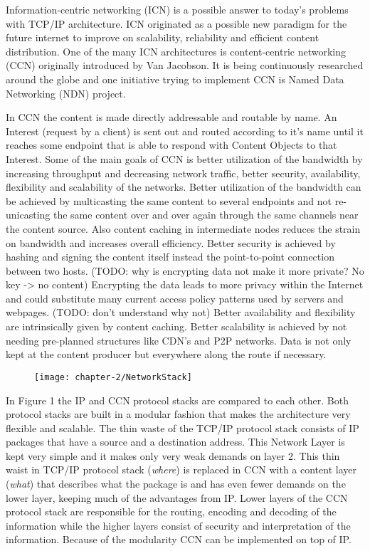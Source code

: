 Information-centric networking (ICN) is a possible answer to today's problems with TCP/IP architecture. ICN originated as a possible new paradigm for the future internet to improve on scalability, reliability and efficient content distribution. One of the many ICN architectures is content-centric networking (CCN) originally introduced by Van Jacobson. It is being continuously researched around the globe and one initiative trying to implement CCN is Named Data Networking (NDN) project.

\vspace{5mm} %

In CCN the content is made directly addressable and routable by name. An Interest (request by a client) is sent out and routed according to it's name until it reaches some endpoint that is able to respond with Content Objects to that Interest. Some of the main goals of CCN is better utilization of the bandwidth by increasing throughput and decreasing network traffic, better security, availability, flexibility and scalability of the networks. Better utilization of the bandwidth can be achieved by multicasting the same content to several endpoints and not re-unicasting the same content over and over again through the same channels near the content source. Also content caching in intermediate nodes reduces the strain on bandwidth and increases overall efficiency. Better security is achieved by hashing and signing the content itself instead the point-to-point connection between two hosts. (TODO: why is encrypting data not make it more private? No key -> no content) Encrypting the data leads to more privacy within the Internet and could substitute many current access policy patterns used by servers and webpages. (TODO: don't understand why not) Better availability and flexibility are intrinsically given by content caching. Better scalability is achieved by not needing pre-planned structures like CDN's and P2P networks. Data is not only kept at the content producer but everywhere along the route if necessary.

\begin{figure}[H]
\texttt{[image: chapter-2/NetworkStack]}
\centering
\end{figure}

In Figure 1 the IP and CCN protocol stacks are compared to each other. Both protocol stacks are built in a modular fashion that makes the architecture very flexible and scalable. The thin waste of the TCP/IP protocol stack consists of IP packages that have a source and a destination address. This Network Layer is kept very simple and it makes only very weak demands on layer 2. This thin waist in TCP/IP protocol stack (\emph{where}) is replaced in CCN with a content layer (\emph{what}) that describes what the package is and has even fewer demands on the lower layer, keeping much of the advantages from IP. Lower layers of the CCN protocol stack are responsible for the routing, encoding and decoding of the information while the higher layers consist of security and interpretation of the information. Because of the modularity CCN can be implemented on top of IP.

